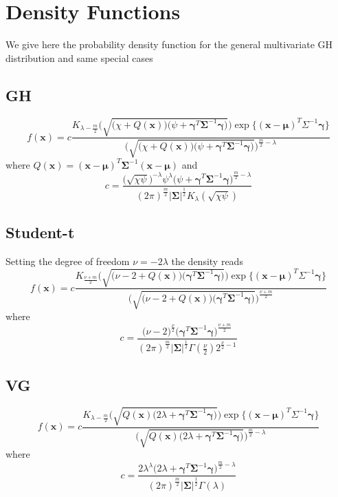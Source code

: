 \section{Density Functions}
We give here the probability density function for the general multivariate GH distribution and same special cases
\subsection{GH}
\begin{equation}
f(\bm{x}) = c\frac{K_{\lambda-\frac{m}{2}}\Big(\sqrt{\big(\chi+Q(\bm{x})\big)\big(\psi+\bm{\gamma}^T\bm{\Sigma}^{-1}\bm{\gamma} \big)}\Big)\exp\big\{(\bm{x}-\bm{\mu})^T\Sigma^{-1}\bm{\gamma}\big\}}{\Big(\sqrt{\big(\chi+Q(\bm{x})\big)\big(\psi+\bm{\gamma}^T\bm{\Sigma}^{-1}\bm{\gamma} \big)}\Big)^{\frac{m}{2}-\lambda}}
\end{equation}
where $Q(\bm{x})=(\bm{x}-\bm{\mu})^T\bm{\Sigma}^{-1}(\bm{x}-\bm{\mu})$ and \[ c=\frac{\big(\sqrt{\chi\psi}\big)^{-\lambda}\psi^{\lambda}\big(\psi+\bm{\gamma}^T\bm{\Sigma}^{-1}\bm{\gamma} \big)^{\frac{m}{2}-\lambda}}{(2\pi)^{\frac{m}{2}}\lvert\bm{\Sigma}\lvert^{\frac{1}{2}}K_{\lambda}(\sqrt{\chi\psi})}  \]
\subsection{Student-t}
Setting the degree of freedom $\nu=-2\lambda$ the density reads
\begin{equation}
f(\bm{x}) = c\frac{K_{\frac{\nu+m}{2}}\Big(\sqrt{\big(\nu-2+Q(\bm{x})\big)\big(\bm{\gamma}^T\bm{\Sigma}^{-1}\bm{\gamma}\big)}\Big)\exp\big\{(\bm{x}-\bm{\mu})^T\Sigma^{-1}\bm{\gamma}\big\}}{\Big(\sqrt{\big(\nu-2+Q(\bm{x})\big)\big(\bm{\gamma}^T\bm{\Sigma}^{-1}\bm{\gamma}\big)}\Big)^{\frac{\nu+m}{2}}}
\end{equation}
where \[ c = \frac{\big(\nu-2\big)^{\frac{\nu}{2}}\big(\bm{\gamma}^T\bm{\Sigma}^{-1}\bm{\gamma}\big)^{\frac{\nu+m}{2}}}{(2\pi)^{\frac{m}{2}}\lvert\bm{\Sigma}\lvert^{\frac{1}{2}}\Gamma(\frac{\nu}{2})2^{\frac{\nu}{2}-1}} \]
\subsection{VG}
\begin{equation}
f(\bm{x}) = c\frac{K_{\lambda-\frac{m}{2}}\Big(\sqrt{Q(\bm{x})\big(2\lambda+\bm{\gamma}^T\bm{\Sigma}^{-1}\bm{\gamma} \big)}\Big)\exp\big\{(\bm{x}-\bm{\mu})^T\Sigma^{-1}\bm{\gamma}\big\}}{\Big(\sqrt{Q(\bm{x})\big(2\lambda+\bm{\gamma}^T\bm{\Sigma}^{-1}\bm{\gamma} \big)}\Big)^{\frac{m}{2}-\lambda}}
\end{equation}
where \[ c=\frac{2\lambda^{\lambda}\big(2\lambda+\bm{\gamma}^T\bm{\Sigma}^{-1}\bm{\gamma}\big)^{\frac{m}{2}-\lambda}}{(2\pi)^{\frac{m}{2}}\lvert\bm{\Sigma}\lvert^{\frac{1}{2}}\Gamma(\lambda)} \]



